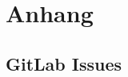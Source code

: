 \documentclass[a4paper, 12pt]{article}
\begin{document}
    \newpage
    \section{Anhang}
    \subsection{GitLab Issues}
    

    
    

\end{document}
